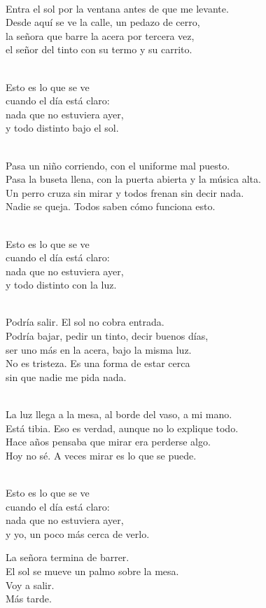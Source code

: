 \begin{lyrics}
\\
Entra el sol por la ventana antes de que me levante.\\
Desde aquí se ve la calle, un pedazo de cerro,\\
la señora que barre la acera por tercera vez,\\
el señor del tinto con su termo y su carrito.

\\
Esto es lo que se ve\\
cuando el día está claro:\\
nada que no estuviera ayer,\\
y todo distinto bajo el sol.

\\
Pasa un niño corriendo, con el uniforme mal puesto.\\
Pasa la buseta llena, con la puerta abierta y la música alta.\\
Un perro cruza sin mirar y todos frenan sin decir nada.\\
Nadie se queja. Todos saben cómo funciona esto.

\\
Esto es lo que se ve\\
cuando el día está claro:\\
nada que no estuviera ayer,\\
y todo distinto con la luz.

\\
Podría salir. El sol no cobra entrada.\\
Podría bajar, pedir un tinto, decir buenos días,\\
ser uno más en la acera, bajo la misma luz.\\
No es tristeza. Es una forma de estar cerca\\
sin que nadie me pida nada.

\\
La luz llega a la mesa, al borde del vaso, a mi mano.\\
Está tibia. Eso es verdad, aunque no lo explique todo.\\
Hace años pensaba que mirar era perderse algo.\\
Hoy no sé. A veces mirar es lo que se puede.

\\
Esto es lo que se ve\\
cuando el día está claro:\\
nada que no estuviera ayer,\\
y yo, un poco más cerca de verlo.

La señora termina de barrer.\\
El sol se mueve un palmo sobre la mesa.\\
Voy a salir.\\
Más tarde.
\end{lyrics}

